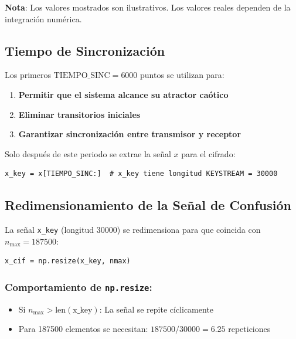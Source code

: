 \documentclass[12pt,a4paper]{article}
\begin{document}
\textbf{Nota}: Los valores mostrados son ilustrativos. Los valores reales dependen de la integración numérica.

\subsection{Tiempo de Sincronización}

Los primeros $\text{TIEMPO\_SINC} = 6000$ puntos se utilizan para:
\begin{enumerate}
    \item \textbf{Permitir que el sistema alcance su atractor caótico}
    \item \textbf{Eliminar transitorios iniciales}
    \item \textbf{Garantizar sincronización entre transmisor y receptor}
\end{enumerate}

Solo después de este periodo se extrae la señal $x$ para el cifrado:
\begin{lstlisting}
x_key = x[TIEMPO_SINC:]  # x_key tiene longitud KEYSTREAM = 30000
\end{lstlisting}

\subsection{Redimensionamiento de la Señal de Confusión}

La señal \texttt{x\_key} (longitud 30000) se redimensiona para que coincida con $n_{\text{max}} = 187500$:

\begin{lstlisting}
x_cif = np.resize(x_key, nmax)
\end{lstlisting}

\subsubsection*{Comportamiento de \texttt{np.resize}:}
\begin{itemize}
    \item Si $n_{\text{max}} > \text{len}(\text{x\_key})$: La señal se repite cíclicamente
    \item Para 187500 elementos se necesitan: $187500 / 30000 = 6.25$ repeticiones
\end{itemize}
\end{document}
